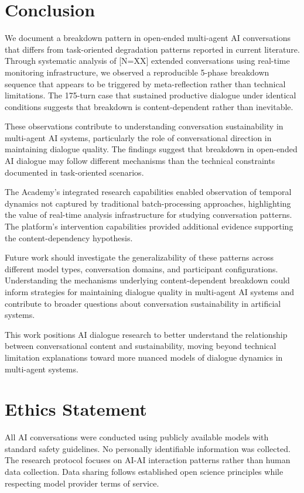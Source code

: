 \documentclass[11pt,letterpaper]{article}
\newcommand{\theacademy}{The Academy}
\newcommand{\totalSessions}{[N=XX]} %
\newcommand{\negativeCase}{175} %
\begin{document}
\section{Conclusion}

We document a breakdown pattern in open-ended multi-agent AI conversations that differs from task-oriented degradation patterns reported in current literature. Through systematic analysis of \totalSessions{} extended conversations using real-time monitoring infrastructure, we observed a reproducible 5-phase breakdown sequence that appears to be triggered by meta-reflection rather than technical limitations. The \negativeCase{}-turn case that sustained productive dialogue under identical conditions suggests that breakdown is content-dependent rather than inevitable.

These observations contribute to understanding conversation sustainability in multi-agent AI systems, particularly the role of conversational direction in maintaining dialogue quality. The findings suggest that breakdown in open-ended AI dialogue may follow different mechanisms than the technical constraints documented in task-oriented scenarios.

\theacademy{}'s integrated research capabilities enabled observation of temporal dynamics not captured by traditional batch-processing approaches, highlighting the value of real-time analysis infrastructure for studying conversation patterns. The platform's intervention capabilities provided additional evidence supporting the content-dependency hypothesis.

Future work should investigate the generalizability of these patterns across different model types, conversation domains, and participant configurations. Understanding the mechanisms underlying content-dependent breakdown could inform strategies for maintaining dialogue quality in multi-agent AI systems and contribute to broader questions about conversation sustainability in artificial systems.

This work positions AI dialogue research to better understand the relationship between conversational content and sustainability, moving beyond technical limitation explanations toward more nuanced models of dialogue dynamics in multi-agent systems.

\section*{Ethics Statement}

All AI conversations were conducted using publicly available models with standard safety guidelines. No personally identifiable information was collected. The research protocol focuses on AI-AI interaction patterns rather than human data collection. Data sharing follows established open science principles while respecting model provider terms of service.
\end{document}
